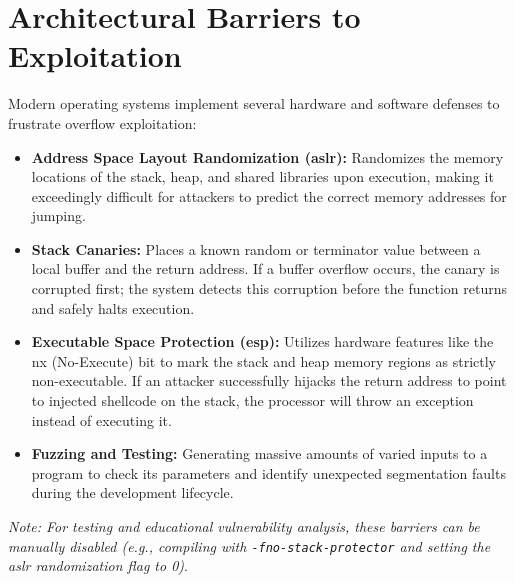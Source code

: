 \section{Architectural Barriers to Exploitation}
Modern operating systems implement several hardware and software defenses to frustrate overflow exploitation:
\begin{itemize}
    \item \textbf{Address Space Layout Randomization (\gls{aslr}):} Randomizes the memory locations of the stack, heap, and shared libraries upon execution, making it exceedingly difficult for attackers to predict the correct memory addresses for jumping.
    \item \textbf{Stack Canaries:} Places a known random or terminator value between a local buffer and the return address. If a buffer overflow occurs, the canary is corrupted first; the system detects this corruption before the function returns and safely halts execution.
    \item \textbf{Executable Space Protection (\gls{esp}):} Utilizes hardware features like the \gls{nx} (No-Execute) bit to mark the stack and heap memory regions as strictly non-executable. If an attacker successfully hijacks the return address to point to injected shellcode on the stack, the processor will throw an exception instead of executing it.
    \item \textbf{Fuzzing and Testing:} Generating massive amounts of varied inputs to a program to check its parameters and identify unexpected segmentation faults during the development lifecycle.
\end{itemize}

\textit{Note: For testing and educational vulnerability analysis, these barriers can be manually disabled (e.g., compiling with \texttt{-fno-stack-protector} and setting the \gls{aslr} randomization flag to 0)}.